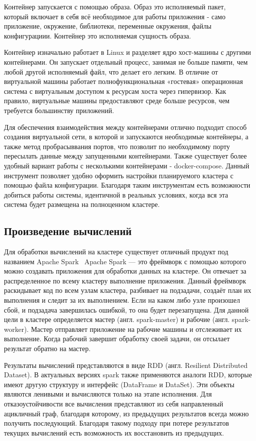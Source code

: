 Контейнер запускается с помощью образа.
Образ это исполняемый пакет, который включает в себя всё необходимое для работы приложения - само приложение, окружение, библиотеки, переменные окружения, файлы конфигурациии.
Контейнер это исполняемая сущность образа.

Контейнер изначально работает в Linux и разделяет ядро ​​хост-машины с другими контейнерами.
Он запускает отдельный процесс, занимая не больше памяти, чем любой другой исполняемый файл, что делает его легким.
В отличие от виртуальной машины работает полнофункциональная «гостевая» операционная система с виртуальным доступом к ресурсам хоста через гипервизор.
Как правило, виртуальные машины предоставляют среде больше ресурсов, чем требуется большинству приложений.

Для обеспечения взаимодействия между контейнерами отлично подходит способ создания виртуальной сети, в которой и запускаются необходимые контейнеры, а также метод пробрасыввания портов, что позволит по необходимому порту пересылать данные между запущенными контейнерами.
Также существует более удобный вариант работы с несколькими контейнерами - docker-compose.
Данный инструмент позволяет удобно оформить настройки планируемого кластера с помощью файла конфигурации.
Благодаря таким инструментам есть возможности добиться работы системы, идентичной в реальных условиях, когда вся эта система будет размещена на полноценном кластере.

\subsection{Произведение вычислений}

Для обработки вычислений на кластере существует отличный продукт под названием Apache Spark~\cite{spark_documentation_intro}
Apache Spark — это фреймворк с помощью которого можно создавать приложения для обработки данных на кластере.
Он отвечает за распределенное по всему кластеру выполнение приложения.
Данный фреймворк раскидывает код по всем узлам кластера, разбивает на подзадачи, создаёт план их выполнения и следит за их выполнением.
Если на каком либо узле произошел сбой, и подзадача завершилась ошибкой, то она будет перезапущена.
Для данной цели в кластере определяется мастер (англ. spark-master) и рабочие (англ. spark-worker).
Мастер отправляет приложение на рабочие машины и отслеживает их выполнение.
Когда рабочий завершит обработку своей задачи, он отсылает результат обратно на мастер.

Результаты вычислений представляются в виде RDD (англ. Resilient Distributed Dataset). 
В актуальных версиях spark также применяются аналоги RDD, которые имеют другую структуру и интерфейс (DataFrame и DataSet).
Эти объекты являются ленивыми и вычисляются только на этапе исполнения.
Для отказоустойчивости все вычисления представляют из себя направленный ацикличный граф, благодаря которому, из предыдущих результатов всегда можно получить последующий.
Благодаря такому подходу при потере результатов текущих вычислений есть возможность их восстановить из предыдущих.

